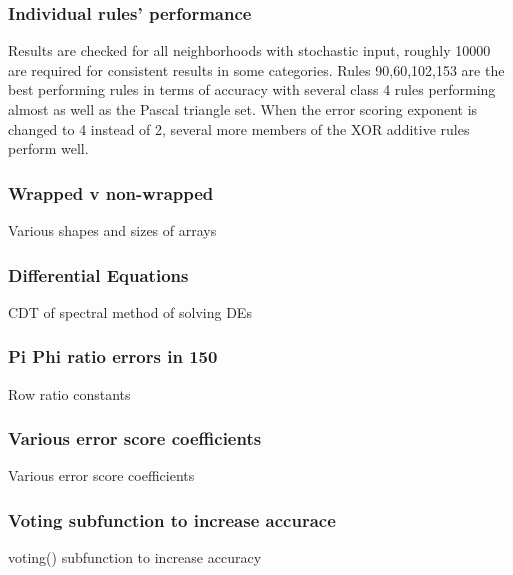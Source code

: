 \documentclass[11pt]{article}
\begin{document}
\subsubsection{Individual rules' performance}
Results are checked for all neighborhoods with stochastic input, roughly 10000 are
required for consistent results in some categories. Rules 90,60,102,153 are the best
performing rules in terms of accuracy with several class 4 rules performing almost as
well as the Pascal triangle set. When the error scoring exponent is changed to 4
instead of 2, several more members of the XOR additive rules perform well.
\\

\subsubsection{Wrapped v non-wrapped}
Various shapes and sizes of arrays
\\
\subsubsection{Differential Equations}
CDT of spectral method of solving DEs
\\
\subsubsection{Pi Phi ratio errors in 150}
Row ratio constants
\\
\subsubsection{Various error score coefficients}
Various error score coefficients
\\
\subsubsection{Voting subfunction to increase accurace}
voting() subfunction to increase accuracy
\\


\end{document}
